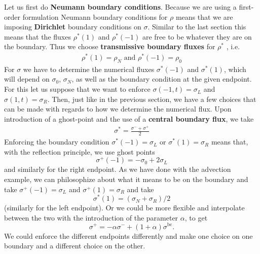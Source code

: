 \documentclass{report}
\numberwithin{equation}{section}
\begin{document}
Let us first do \textbf{Neumann boundary conditions}. Because we are using a first-order formulation Neumann boundary conditions for $\rho$ means that we are imposing \textbf{Dirichlet} boundary conditions on $ \sigma $. Similar to the last section this means that the fluxes $\rho^*(1)$ and $\rho^*(-1)$ are free to be whatever they are on the boundary. Thus we choose \textbf{transmissive boundary fluxes} for $\rho^*$ , i.e.
\begin{align}
    \rho^*(1) = \rho_N \text{ and } \rho^*(-1) = \rho_0
\end{align}
For $\sigma$ we have to determine the numerical fluxes $\sigma^*(-1)$ and $\sigma^*(1)$, which will depend on $\sigma_0$, $\sigma_N$, as well as the boundary condition at the given endpoint. For this let us suppose that we want to enforce $\sigma(-1,t) = \sigma_L$ and $\sigma(1, t) = \sigma_R$. Then, just like in the previous section, we have a few choices that can be made with regards to how we determine the numerical flux. Upon introduction of a ghost-point and the use of a \textbf{central boundary flux}, we take
\begin{align}
\sigma^* = \frac{\sigma^- + \sigma^+}{2}
\end{align}
Enforcing the boundary condition $\sigma^*(-1) = \sigma_L$ or $\sigma^*(1) = \sigma_R$ means that, with the reflection principle, we use ghost points 
\begin{equation}
    \sigma^+(-1) = - \sigma_0 + 2 \sigma_L
\end{equation}
and similarly for the right endpoint. As we have done with the advection example, we can philosophize about what it means to be on the boundary and take $\sigma^+(-1)  = \sigma_L$ and $\sigma^+(1) = \sigma_R$ and take 
\begin{equation}
    \sigma^*(1) = (\sigma_N + \sigma_R)/2
\end{equation}
(similarly for the left endpoint). Or we could be more flexible and interpolate between the two with the introduction of the parameter $\alpha$, to get 
\begin{equation}
    \sigma^+ = - \alpha \sigma^- +  (1+\alpha)\sigma^{\text{bc}}.
\end{equation}
We could enforce the different endpoints differently and make one choice on one boundary and a different choice on the other.
\end{document}
